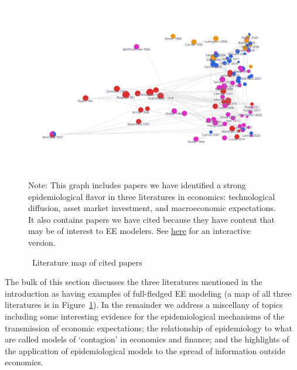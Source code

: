 \begin{figure}[!ht] \centering  %
  \caption{ ~Literature map of cited papers}
  \label{fig:graph_mixer}
  \centerline{\includegraphics[width=\textwidth]{./figures/graph_mixer}}
  \begin{flushleft}
    {\footnotesize Note: This graph includes papers we have identified a strong epidemiological flavor in three literatures in economics: technological diffusion, asset market investment, and macroeconomic expectations.  It also contains papers we have cited because they have content that may be of interest to EE modelers. See \href{https://app.litmaps.co/shared/F3D33DB4-28AA-42AB-ADD9-F94682D1C9CF}{here} for an interactive version.}
  \end{flushleft}
\end{figure}

The bulk of this section discusses the three literatures mentioned in the introduction as having examples of full-fledged EE modeling (a map of all three literatures is in Figure~\ref{fig:graph_mixer}).  In the remainder we address a miscellany of topics including some interesting evidence for the epidemiological mechanisms of the transmission of economic expectations; the relationship of epidemiology to what are called models of `contagion' in economics and finance; and the highlights of the application of epidemiological models to the spread of information outside economics.




